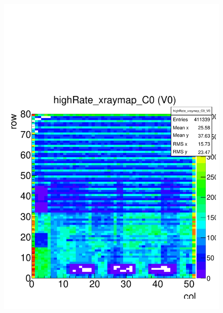 \documentclass[a4paper,12pt,twoside]{article}
\begin{document}
\begin{figure} [h!]
\begin{minipage}{.48\textwidth}
  \includegraphics[width=\textwidth]{./Figures/Efficiency_BackgroundMap.pdf}
  \label{Efficiency-Hitmap}
\end{minipage}
\end{figure}
\end{document}
